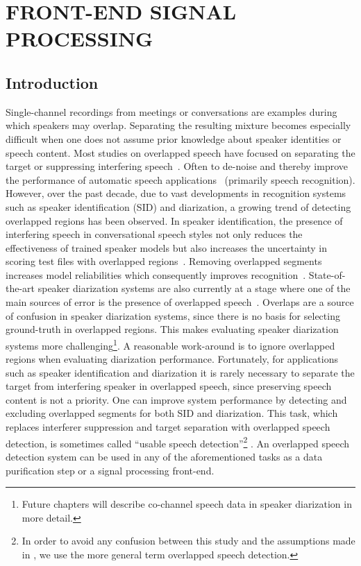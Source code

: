 
\chapter{FRONT-END SIGNAL PROCESSING}

\section{Introduction}
\label{sec:intro}
 
Single-channel recordings from meetings or conversations are examples during which speakers may overlap.
Separating the resulting mixture becomes especially difficult when one does not assume prior knowledge about speaker identities or speech content. 
Most studies on overlapped speech have focused on separating the target or suppressing interfering speech~\cite{morgan_cochannel}. 
Often to de-noise and thereby improve the performance of automatic speech applications~\cite{Quat_Dan_cch_sup,Chazan_93,cooke20101} (primarily speech recognition). 
However, over the past decade, due to vast developments in recognition systems such as speaker identification (SID) and diarization, a growing trend of detecting overlapped regions has been observed. 
In speaker identification, the presence of interfering speech in conversational speech styles not only reduces the effectiveness of trained speaker models but also increases the uncertainty in scoring test files with overlapped regions~\cite{yantorno_report}. 
Removing overlapped segments increases model reliabilities which consequently improves recognition~\cite{shokouhi2015}.    
State-of-the-art speaker diarization systems are also currently at a stage where one of the main sources of error is the presence of overlapped speech~\cite{boakye_icassp_08,zelenak12Trans}. 
Overlaps are a source of confusion in speaker diarization systems, since there is no basis for selecting ground-truth in overlapped regions. 
This makes evaluating speaker diarization systems more challenging\footnote{Future chapters will describe co-channel speech data in speaker diarization in more detail.}. 
A reasonable work-around is to ignore overlapped regions when evaluating diarization performance. 
Fortunately, for applications such as speaker identification and diarization it is rarely necessary to separate the target from interfering speaker in overlapped speech, since preserving speech content is not a priority. 
One can improve system performance by detecting and excluding overlapped segments for both SID and diarization. 
This task, which replaces interferer suppression and target separation with overlapped speech detection, is sometimes called ``usable speech detection''\footnote{In order to avoid any confusion between this study and the assumptions made in \cite{yantorno_report}, we use the more general term overlapped speech detection.} \cite{yantorno_report}. 
An overlapped speech detection system can be used in any of the aforementioned tasks as a data purification step or a signal processing front-end. 

